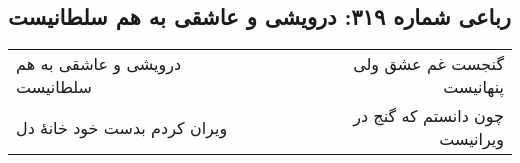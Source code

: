 \begin{center}
\section*{رباعی شماره ۳۱۹: درویشی و عاشقی به هم سلطانیست}
\label{sec:0319}
\begin{longtable}{l p{0.5cm} r}
درویشی و عاشقی به هم سلطانیست
&&
گنجست غم عشق ولی پنهانیست
\\
ویران کردم بدست خود خانهٔ دل
&&
چون دانستم که گنج در ویرانیست
\\
\end{longtable}
\end{center}
